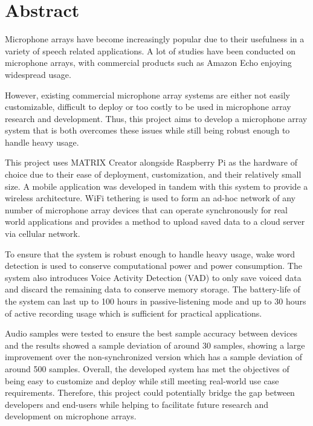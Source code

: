 \documentclass[hidelinks,12pt]{report} %
\begin{document}
\setcounter{page}{3} %

\chapter*{Abstract} %
%
Microphone arrays have become increasingly popular due to their usefulness in a variety of speech related applications. A lot of studies have been conducted on microphone arrays, with commercial products such as Amazon Echo enjoying widespread usage.

However, existing commercial microphone array systems are either not easily customizable, difficult to deploy or too costly to be used in microphone array research and development. Thus, this project aims to develop a microphone array system that is both overcomes these issues while still being robust enough to handle heavy usage.

This project uses MATRIX Creator alongside Raspberry Pi as the hardware of choice due to their ease of deployment, customization, and their relatively small size. A mobile application was developed in tandem with this system to provide a wireless architecture. WiFi tethering is used to form an ad-hoc network of any number of microphone array devices that can operate synchronously for real world applications and provides a method to upload saved data to a cloud server via cellular network.

To ensure that the system is robust enough to handle heavy usage, wake word detection is used to conserve computational power and power consumption. The system also introduces Voice Activity Detection (VAD) to only save voiced data and discard the remaining data to conserve memory storage.  
The battery-life of the system can last up to 100 hours in passive-listening mode and up to 30 hours of active recording usage which is sufficient for practical applications. 

Audio samples were tested to ensure the best sample accuracy between devices and the results showed a sample deviation of around 30 samples, showing a large improvement over the non-synchronized version which has a sample deviation of around 500 samples.
Overall, the developed system has met the objectives of being easy to customize and deploy while still meeting real-world use case requirements. Therefore, this project could potentially bridge the gap between developers and end-users while helping to facilitate future research and development on microphone arrays.
\end{document}
